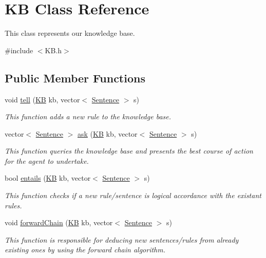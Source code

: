 \hypertarget{classKB}{}\section{KB Class Reference}
\label{classKB}


This class represents our knowledge base.  




{\ttfamily \#include $<$K\+B.\+h$>$}

\subsection*{Public Member Functions}
\begin{DoxyCompactItemize}
\item 
void \mbox{\hyperlink{classKB_ab0b72bc95f5f3cd72ec0d01a10310b9f}{tell}} (\mbox{\hyperlink{classKB}{KB}} kb, vector$<$ \mbox{\hyperlink{classSentence}{Sentence}} $>$ s)
\begin{DoxyCompactList}\small\item\em This function adds a new rule to the knowledge base. \end{DoxyCompactList}\item 
vector$<$ \mbox{\hyperlink{classSentence}{Sentence}} $>$ \mbox{\hyperlink{classKB_a12ab1eba4e3792f802c943163a308518}{ask}} (\mbox{\hyperlink{classKB}{KB}} kb, vector$<$ \mbox{\hyperlink{classSentence}{Sentence}} $>$ s)
\begin{DoxyCompactList}\small\item\em This function queries the knowledge base and presents the best course of action for the agent to undertake. \end{DoxyCompactList}\item 
bool \mbox{\hyperlink{classKB_afd8d8289f3a2e60e2118b822f5c99576}{entails}} (\mbox{\hyperlink{classKB}{KB}} kb, vector$<$ \mbox{\hyperlink{classSentence}{Sentence}} $>$ s)
\begin{DoxyCompactList}\small\item\em This function checks if a new rule/sentence is logical accordance with the existant rules. \end{DoxyCompactList}\item 
void \mbox{\hyperlink{classKB_a1d77685c04f42bb2fba29ed81773dbc7}{forward\+Chain}} (\mbox{\hyperlink{classKB}{KB}} kb, vector$<$ \mbox{\hyperlink{classSentence}{Sentence}} $>$ s)
\begin{DoxyCompactList}\small\item\em This function is responsible for deducing new sentences/rules from already existing ones by using the forward chain algorithm. \end{DoxyCompactList}\item 

\end{DoxyCompactItemize}
